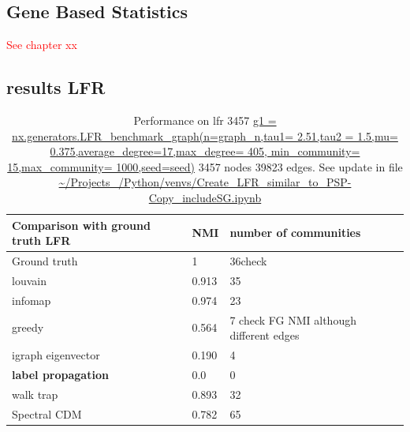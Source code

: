 \subsection{Gene Based Statistics}
\textcolor{red}{See chapter xx}

\subsection{results LFR}
\begin{table}[]
    \centering
    \begin{tabular}{lll}
    \toprule
    Comparison with ground truth LFR & NMI  & number of communities \\
    \midrule
    Ground truth & 1 & 36check \\
       louvain  &0.913 & 35\\
 infomap  &0.974 & 23\\
 greedy  &0.564 & 7 check FG NMI although different edges \\ 
 igraph eigenvector& 0.190 & 4 \\
\textbf{ label propagation } & 0.0 & 0\\
 walk trap  & 0.893 & 32\\
 Spectral CDM & 0.782 & 65\\
 \bottomrule
  
    \end{tabular}
    \caption{Performance on lfr 3457 \url{g1 = nx.generators.LFR_benchmark_graph(n=graph_n,tau1= 2.51,tau2 = 1.5,mu= 0.375,average_degree=17,max_degree= 405, min_community= 15,max_community= 1000,seed=seed)} 3457 nodes 39823 edges. See update in file \url{~/Projects_/Python/venvs/Create_LFR_similar_to_PSP-Copy_includeSG.ipynb}}
    \label{tab:Performance on lfr 3457 }
\end{table}

